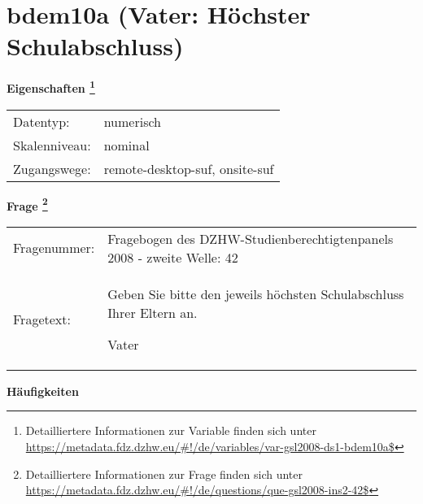 
    \setcounter{footnote}{0}

    \vspace*{-1.8cm}
	\section{bdem10a (Vater: Höchster Schulabschluss)}
	\label{section:bdem10a}



    \vspace*{0.5cm}
    \noindent\textbf{Eigenschaften
	\footnote{Detailliertere Informationen zur Variable finden sich unter
		\url{https://metadata.fdz.dzhw.eu/\#!/de/variables/var-gsl2008-ds1-bdem10a$}}}\\
	\begin{tabularx}{\hsize}{@{}lX}
	Datentyp: & numerisch \\
	Skalenniveau: & nominal \\
	Zugangswege: &
	  remote-desktop-suf, 
	  onsite-suf
 \\
    \end{tabularx}



				\vspace*{0.5cm}
                \noindent\textbf{Frage
	                \footnote{Detailliertere Informationen zur Frage finden sich unter
		              \url{https://metadata.fdz.dzhw.eu/\#!/de/questions/que-gsl2008-ins2-42$}}}\\
				\begin{tabularx}{\hsize}{@{}lX}
					Fragenummer: &
					  Fragebogen des DZHW-Studienberechtigtenpanels 2008 - zweite Welle:
					  42
 \\
					Fragetext: & Geben Sie bitte den jeweils höchsten Schulabschluss Ihrer Eltern an.\par  Vater \\
				\end{tabularx}





        		\vspace*{0.5cm}
                \noindent\textbf{Häufigkeiten}

